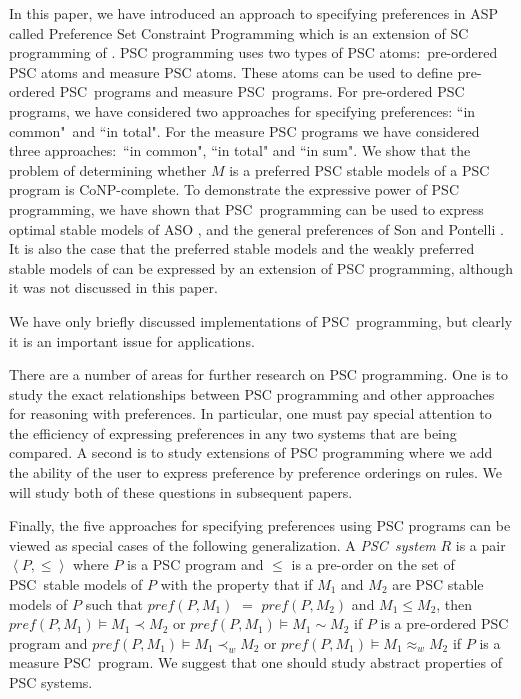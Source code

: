 \documentclass[letterpaper]{article}\usepackage{aaai}
\begin{document}
In this paper, we have introduced an approach to specifying preferences in ASP
called Preference Set Constraint Programming which is an extension of SC
programming of \cite{MR}. PSC programming uses two types of PSC
atoms:\ pre-ordered PSC atoms and measure PSC atoms. These atoms can be used
to define pre-ordered PSC\ programs and measure PSC\ programs. For pre-ordered
PSC programs, we have considered two approaches for specifying preferences:
\textquotedblleft in common"\ and \textquotedblleft in total". For the measure
PSC programs we have considered three approaches:\ \textquotedblleft in
common", \textquotedblleft in total" and \textquotedblleft in sum". We show
that the problem of determining whether $M$ is a preferred PSC stable models
of a PSC program is CoNP-complete. To demonstrate the expressive power of PSC
programming, we have shown that PSC\ programming can be used to express
optimal stable models of ASO \cite{BNT03}, and the general preferences of Son
and Pontelli \cite{SP}. It is also the case that the preferred stable models
and the weakly preferred stable models of \cite{BrewkaE99} can be expressed by
an extension of PSC programming, although it was not discussed in this paper.

We have only briefly discussed implementations of PSC\ programming, but
clearly it is an important issue for applications.

There are a number of areas for further research on PSC programming. One is to
study the exact relationships between PSC programming and other approaches for
reasoning with preferences. In particular, one must pay special attention to
the efficiency of expressing preferences in any two systems that are being
compared. A second is to study extensions of PSC programming where we add the
ability of the user to express preference by preference orderings on rules. We
will study both of these questions in subsequent papers.

Finally, the five approaches for specifying preferences using PSC programs can
be viewed as special cases of the following generalization. A
\emph{PSC\ system} $R$ is a pair $\left\langle P,\leq\right\rangle $ where $P$
is a PSC program and $\leq$ is a pre-order on the set of PSC\ stable models of
$P$ with the property that if $M_{1}$ and $M_{2}$ are PSC stable models of $P$
such that $pref\left(  P,M_{1}\right)  $ $=$ $pref\left(  P,M_{2}\right)  $
and $M_{1}\leq M_{2}$, then $pref\left(  P,M_{1}\right)  \models M_{1}\prec
M_{2}$ or $pref\left(  P,M_{1}\right)  \models M_{1}\sim M_{2}$ if $P$ is a
pre-ordered PSC$\ $program and $pref\left(  P,M_{1}\right)  \models M_{1}\prec_{w}M_{2}$ or $pref\left(  P,M_{1}\right)  \models M_{1}\approx_{w}M_{2}$
if $P$ is a measure PSC\ program. We suggest that one should study abstract
properties of PSC systems.



\end{document}
